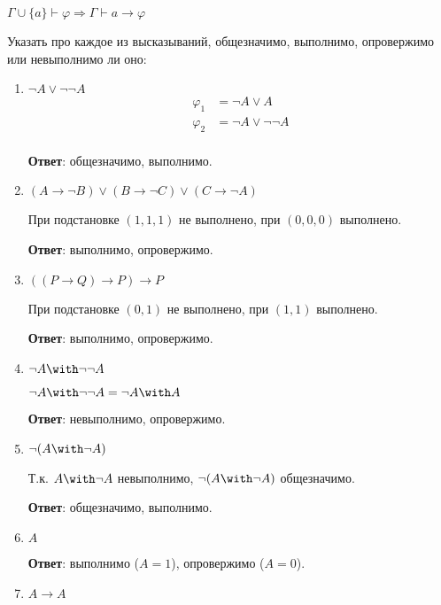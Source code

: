 \begin{lemma}[о дедукции]
    \(\Gamma \cup \{a\} \vdash \varphi \Rightarrow \Gamma \vdash a \to \varphi\)
\end{lemma}

\begin{exercise}
    Указать про каждое из высказываний, общезначимо, выполнимо, опровержимо или невыполнимо ли оно:
    \begin{enumerate}
        \item \(\neg A \lor \neg\neg A\)
              \begin{align*}
                  \varphi_1 & = \neg A \lor A           \\
                  \varphi_2 & = \neg A \lor \neg \neg A \\
              \end{align*}

              \textbf{Ответ}: общезначимо, выполнимо.
        \item \((A \to \neg B) \lor (B \to \neg C) \lor (C \to \neg A)\)

              При подстановке \((1, 1, 1)\) не выполнено, при \((0, 0, 0)\) выполнено.

              \textbf{Ответ}: выполнимо, опровержимо.

        \item \(((P \to Q) \to P) \to P\)

              При подстановке \((0, 1)\) не выполнено, при \((1, 1)\) выполнено.

              \textbf{Ответ}: выполнимо, опровержимо.

        \item \(\neg A \with \neg \neg A\)

              \(\neg A \with \neg \neg A = \neg A \with A\)

              \textbf{Ответ}: невыполнимо, опровержимо.

        \item \(\neg (A \with \neg A)\)

              Т.к. \(A\with \neg A\) невыполнимо, \(\neg (A\with \neg A)\) общезначимо.

              \textbf{Ответ}: общезначимо, выполнимо.

        \item \(A\)

              \textbf{Ответ}: выполнимо (\(A = 1\)), опровержимо (\(A = 0\)).

        \item \(A \to A\)


\end{enumerate}
\end{exercise}
